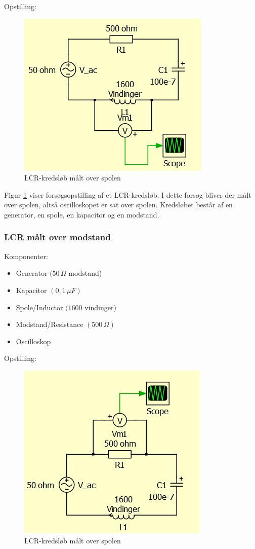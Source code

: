 Opstilling:

\begin{figure}[H]
\centering
\includegraphics[scale=1]{Vildledning/Schematics/Kredslb/LCR_spole}
\caption{LCR-kredsløb målt over spolen}
\label{figure:lcrspole}
\end{figure}

Figur \ref{figure:lcrspole} viser forsøgsopstilling af et LCR-kredsløb. I dette forsøg bliver der målt over spolen, altså oscilloskopet er sat over spolen. Kredsløbet består af en generator, en spole, en kapacitor og en modstand.

\subsubsection{LCR målt over modstand}

Komponenter:

\begin{itemize}
\item Generator $(50\, \Omega$ modstand)
\item Kapacitor $( 0,1\, \mu F)$
\item Spole/Inductor $(1600$ vindinger)
\item Modstand/Resistance $(500\, \Omega)$
\item Oscilloskop
\end{itemize}


Opstilling:

\begin{figure}[H]
\centering
\includegraphics[scale=1]{Vildledning/Schematics/Kredslb/LCR_modstand}
\caption{LCR-kredsløb målt over spolen}
\label{lcrmodstand}
\end{figure}

